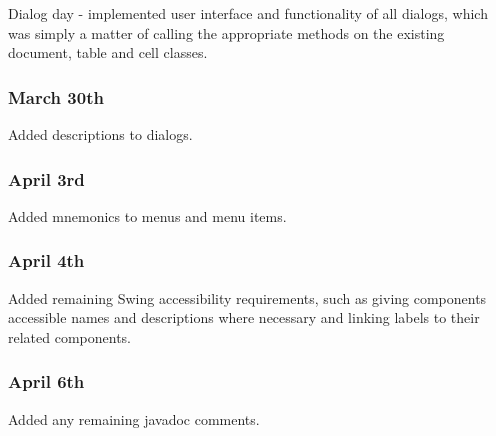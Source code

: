 Dialog day - implemented user interface and functionality of all dialogs, which 
was simply a matter of calling the appropriate methods on the existing document,
table and cell classes.

\subsubsection{March 30th}

Added descriptions to dialogs.

\subsubsection{April 3rd}

Added mnemonics to menus and menu items.

\subsubsection{April 4th}

Added remaining Swing accessibility requirements, such as giving components
accessible names and descriptions where necessary and linking labels to their
related components.

\subsubsection{April 6th}

Added any remaining javadoc comments.
